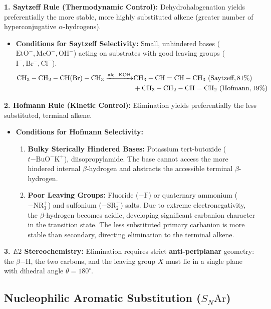 \documentclass[10pt,a4paper]{article}
\begin{document}
\begin{formulabox}
\textbf{1. Saytzeff Rule (Thermodynamic Control):} Dehydrohalogenation yields preferentially the more stable, more highly substituted alkene (greater number of hyperconjugative $\alpha$-hydrogens).
\begin{itemize}
  \item \textbf{Conditions for Saytzeff Selectivity:} Small, unhindered bases ($\mathrm{EtO^-, MeO^-, OH^-}$) acting on substrates with good leaving groups ($\mathrm{I^-, Br^-, Cl^-}$).
  \begin{align}
    \mathrm{CH_3-CH_2-CH(Br)-CH_3} \xrightarrow{\mathrm{alc.\ KOH}} &\mathbf{\mathrm{CH_3-CH=CH-CH_3}} \ (\text{Saytzeff}, 81\%) \notag \\
    &+ \mathrm{CH_3-CH_2-CH=CH_2} \ (\text{Hofmann}, 19\%)
  \end{align}
\end{itemize}
\textbf{2. Hofmann Rule (Kinetic Control):} Elimination yields preferentially the less substituted, terminal alkene.
\begin{itemize}
  \item \textbf{Conditions for Hofmann Selectivity:}
  \begin{enumerate}
    \item \textbf{Bulky Sterically Hindered Bases:} Potassium tert-butoxide ($t\mathrm{-BuO^-K^+}$), diisopropylamide. The base cannot access the more hindered internal $\beta$-hydrogen and abstracts the accessible terminal $\beta$-hydrogen.
    \item \textbf{Poor Leaving Groups:} Fluoride ($-\mathrm{F}$) or quaternary ammonium ($-\mathrm{NR_3^+}$) and sulfonium ($-\mathrm{SR_2^+}$) salts. Due to extreme electronegativity, the $\beta$-hydrogen becomes acidic, developing significant carbanion character in the transition state. The less substituted primary carbanion is more stable than secondary, directing elimination to the terminal alkene.
  \end{enumerate}
\end{itemize}
\textbf{3. $E2$ Stereochemistry:} Elimination requires strict \textbf{anti-periplanar} geometry: the $\beta\mathrm{-H}$, the two carbons, and the leaving group $X$ must lie in a single plane with dihedral angle $\theta = 180^\circ$.
\end{formulabox}

\subsection{Nucleophilic Aromatic Substitution (\texorpdfstring{$S_N\mathrm{Ar}$}{SNAr})}
\end{document}
